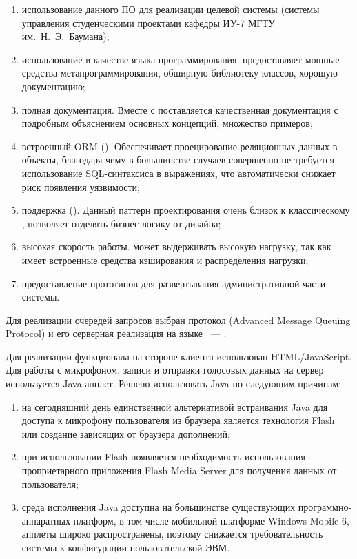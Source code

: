 \begin{enumerate}
\item использование данного ПО для реализации целевой системы (системы
управления студенческими проектами кафедры ИУ-7 МГТУ им.~Н.~Э.~Баумана);
\item использование  в качестве языка программирования.  предоставляет мощные средства метапрограммирования, обширную библиотеку классов, хорошую документацию;
\item полная документация. Вместе с  поставляется качественная документация с подробным объяснением основных концепций, множество примеров;
\item встроенный ORM (). Обеспечивает проецирование реляционных данных в объекты, благодаря чему в большинстве случаев совершенно не требуется использование SQL-синтаксиса в выражениях, что автоматически снижает риск появления  уязвимости;
\item поддержка  (). Данный паттерн проектирования очень близок к классическому , позволяет отделять бизнес-логику от дизайна;
\item высокая скорость работы.  может выдерживать высокую нагрузку, так как имеет встроенные средства кэширования и распределения нагрузки;
\item предоставление прототипов для развертывания административной части системы.
\end{enumerate}

Для реализации очередей запросов выбран протокол  (Advanced Message
Queuing Protocol) и его серверная реализация на языке ~---
.

Для реализации функционала на стороне клиента использован HTML/JavaScript. Для
работы с микрофоном, записи и отправки голосовых данных на
сервер используется Java-апплет. Решено использовать Java по следующим причинам:

\begin{enumerate}
\item на сегодняшний день единственной альтернативой встраивания Java для
доступа к микрофону пользователя из браузера является технология Flash или
создание зависящих от браузера дополнений;
\item при использовании Flash появляется необходимость использования
проприетарного приложения Flash Media Server для получения данных от
пользователя;
\item среда исполнения Java доступна на большинстве существующих
программно-аппаратных платформ, в том числе мобильной платформе Windows Mobile
6, апплеты широко распространены, поэтому снижается требовательность системы к
конфигурации пользовательской ЭВМ.
\end{enumerate}

